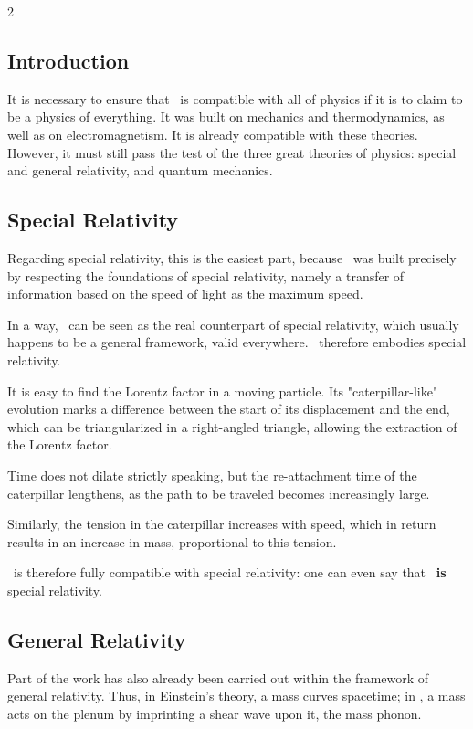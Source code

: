 \begin{multicols}{2}
	\subsection{Introduction} 
	
	It is necessary to ensure that \PQ\ is compatible with all of physics if it is to claim to be a physics of everything. It was built on mechanics and thermodynamics, as well as on electromagnetism. It is already compatible with these theories. However, it must still pass the test of the three great theories of physics: special and general relativity, and quantum mechanics.
	
	\subsection{Special Relativity}
	
	Regarding special relativity, this is the easiest part, because \PQ\ was built precisely by respecting the foundations of special relativity, namely a transfer of information based on the speed of light as the maximum speed.
	
	In a way, \PQ\ can be seen as the real counterpart of special relativity, which usually happens to be a general framework, valid everywhere. \PQ\ therefore embodies special relativity.
	
	It is easy to find the Lorentz factor in a moving particle. Its "caterpillar-like" evolution marks a difference between the start of its displacement and the end, which can be triangularized in a right-angled triangle, allowing the extraction of the Lorentz factor.
	
	Time does not dilate strictly speaking, but the re-attachment time of the caterpillar lengthens, as the path to be traveled becomes increasingly large.
	
	Similarly, the tension in the caterpillar increases with speed, which in return results in an increase in mass, proportional to this tension.
	
	\PQ\ is therefore fully compatible with special relativity: one can even say that \PQ\ \textbf{is} special relativity.
	
	\subsection{General Relativity}
	
	Part of the work has also already been carried out within the framework of general relativity. Thus, in Einstein's theory, a mass curves spacetime; in \PQ, a mass acts on the plenum by imprinting a shear wave upon it, the mass phonon.
	

\end{multicols}
